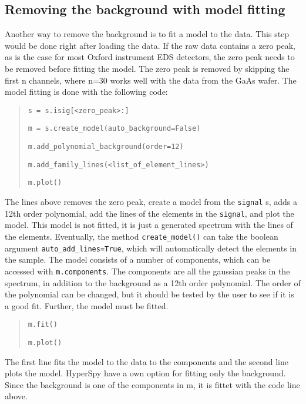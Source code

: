 \subsection{Removing the background with model fitting}
\label{sec:results:steps:model_fitting}
Another way to remove the background is to fit a model to the data.
This step would be done right after loading the data.
If the raw data contains a zero peak, as is the case for most Oxford instrument EDS detectors, the zero peak needs to be removed before fitting the model.
The zero peak is removed by skipping the first n channels, where n=30 works well with the data from the GaAs wafer.
The model fitting is done with the following code:

\begin{quote}
    \verb|s = s.isig[<zero_peak>:]|

    \verb|m = s.create_model(auto_background=False)|

    \verb|m.add_polynomial_background(order=12)|

    \verb|m.add_family_lines(<list_of_element_lines>)|

    \verb|m.plot()|

\end{quote}

The lines above removes the zero peak, create a model from the \verb|signal| s, adds a 12th order polynomial, add the lines of the elements in the \verb|signal|, and plot the model.
This model is not fitted, it is just a generated spectrum with the lines of the elements.
Eventually, the method \verb|create_model()| can take the boolean argument \verb|auto_add_lines=True|, which will automatically detect the elements in the sample.
The model consists of a number of components, which can be accessed with \verb|m.components|.
The components are all the gaussian peaks in the spectrum, in addition to the background as a 12th order polynomial.
The order of the polynomial can be changed, but it should be tested by the user to see if it is a good fit.
Further, the model must be fitted.

\begin{quote}
    \verb|m.fit()|


    \verb|m.plot()|
\end{quote}

The first line fits the model to the data to the components and the second line plots the model.
HyperSpy have a own option for fitting only the background.
Since the background is one of the components in m, it is fittet with the code line above.


